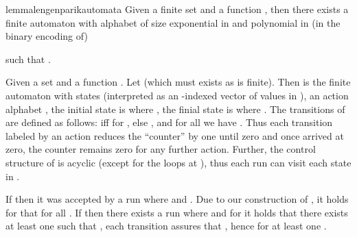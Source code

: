 \documentclass[runningheads,oribibl,]{article}
\newenvironment{proof}{\noindent{\it Proof.\hspace*{.5cm}}}{}
\newcommand{\qed}{\hfill}
\begin{document}
\begin{restatable}{lemma}{lengenparikautomata}\label{lem:genparikautomata}
  Given a finite set  and a function ,
  then there exists a finite automaton  with
  alphabet  of size exponential in  and polynomial in
  (in the binary encoding of)
   
  such that .
\end{restatable}
\begin{proof}
  Given a set  and a function . Let 
  (which must exists as  is finite). Then   is the finite
  automaton  with
  states  (interpreted as an -indexed vector of values
  in ), an action alphabet , the initial state is  where
  , the finial state is  where .
  The transitions of  are defined as follows:
   iff  for , else ,
  and for all  we have . Thus
  each transition labeled by an action  reduces the ``counter'' 
  by one until zero and once arrived at zero, the counter 
  remains zero for any further  action. Further, the control structure
  of  is acyclic (except for the loops at ), thus
  each run can visit each state in .

  If  then it was accepted by a run  where  and . Due to our construction of , it
  holds for  that  for all .
    If  then there exists a run 
  where  and for  it holds that there exists at least one
   such that , each transition  assures that
  , hence  for at least one .\qed
\end{proof}
\end{document}
